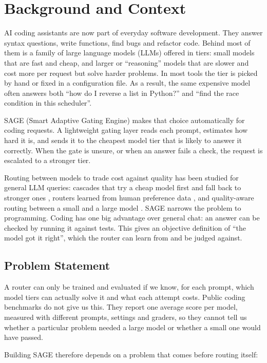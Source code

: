 \section{Background and Context}

AI coding assistants are now part of everyday software development. They answer syntax questions, write functions, find bugs and refactor code. Behind most of them is a family of large language models (LLMs) offered in tiers: small models that are fast and cheap, and larger or ``reasoning'' models that are slower and cost more per request but solve harder problems. In most tools the tier is picked by hand or fixed in a configuration file. As a result, the same expensive model often answers both ``how do I reverse a list in Python?'' and ``find the race condition in this scheduler''.

SAGE (Smart Adaptive Gating Engine) makes that choice automatically for coding requests. A lightweight gating layer reads each prompt, estimates how hard it is, and sends it to the cheapest model tier that is likely to answer it correctly. When the gate is unsure, or when an answer fails a check, the request is escalated to a stronger tier.

Routing between models to trade cost against quality has been studied for general LLM queries: cascades that try a cheap model first and fall back to stronger ones \cite{chen2023frugalgpt}, routers learned from human preference data \cite{ong2024routellm}, and quality-aware routing between a small and a large model \cite{ding2024hybrid}. SAGE narrows the problem to programming. Coding has one big advantage over general chat: an answer can be checked by running it against tests. This gives an objective definition of ``the model got it right'', which the router can learn from and be judged against.

\subsection{Problem Statement}

A router can only be trained and evaluated if we know, for each prompt, which model tiers can actually solve it and what each attempt costs. Public coding benchmarks do not give us this. They report one average score per model, measured with different prompts, settings and graders, so they cannot tell us whether a particular problem needed a large model or whether a small one would have passed.

Building SAGE therefore depends on a problem that comes before routing itself:

